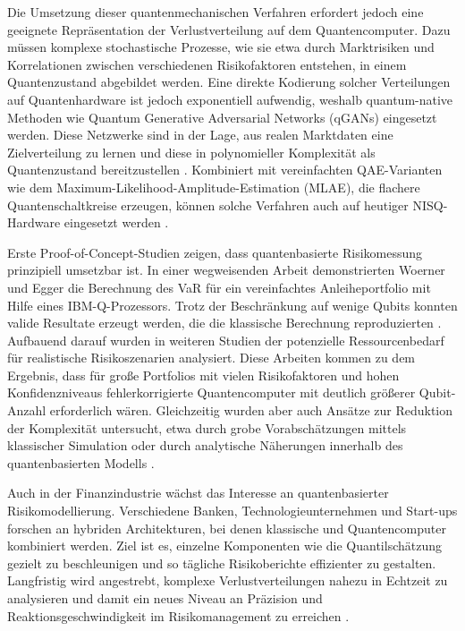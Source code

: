 Die Umsetzung dieser quantenmechanischen Verfahren erfordert jedoch eine geeignete Repräsentation der Verlustverteilung auf dem Quantencomputer. Dazu müssen komplexe stochastische Prozesse, wie sie etwa durch Marktrisiken und Korrelationen zwischen verschiedenen Risikofaktoren entstehen, in einem Quantenzustand abgebildet werden. Eine direkte Kodierung solcher Verteilungen auf Quantenhardware ist jedoch exponentiell aufwendig, weshalb quantum-native Methoden wie Quantum Generative Adversarial Networks (qGANs) eingesetzt werden. Diese Netzwerke sind in der Lage, aus realen Marktdaten eine Zielverteilung zu lernen und diese in polynomieller Komplexität als Quantenzustand bereitzustellen \cite{zoufal_quantum_2019}. Kombiniert mit vereinfachten QAE-Varianten wie dem Maximum-Likelihood-Amplitude-Estimation (MLAE), die flachere Quantenschaltkreise erzeugen, können solche Verfahren auch auf heutiger NISQ-Hardware eingesetzt werden \cite{stamatopoulos_option_2020}.

Erste Proof-of-Concept-Studien zeigen, dass quantenbasierte Risikomessung prinzipiell umsetzbar ist. In einer wegweisenden Arbeit demonstrierten Woerner und Egger die Berechnung des VaR für ein vereinfachtes Anleiheportfolio mit Hilfe eines IBM-Q-Prozessors. Trotz der Beschränkung auf wenige Qubits konnten valide Resultate erzeugt werden, die die klassische Berechnung reproduzierten \cite{egger_quantum_2020}. Aufbauend darauf wurden in weiteren Studien der potenzielle Ressourcenbedarf für realistische Risikoszenarien analysiert. Diese Arbeiten kommen zu dem Ergebnis, dass für große Portfolios mit vielen Risikofaktoren und hohen Konfidenzniveaus fehlerkorrigierte Quantencomputer mit deutlich größerer Qubit-Anzahl erforderlich wären. Gleichzeitig wurden aber auch Ansätze zur Reduktion der Komplexität untersucht, etwa durch grobe Vorabschätzungen mittels klassischer Simulation oder durch analytische Näherungen innerhalb des quantenbasierten Modells \cite{martin2022}.

Auch in der Finanzindustrie wächst das Interesse an quantenbasierter Risikomodellierung. Verschiedene Banken, Technologieunternehmen und Start-ups forschen an hybriden Architekturen, bei denen klassische und Quantencomputer kombiniert werden. Ziel ist es, einzelne Komponenten wie die Quantilschätzung gezielt zu beschleunigen und so tägliche Risikoberichte effizienter zu gestalten. Langfristig wird angestrebt, komplexe Verlustverteilungen nahezu in Echtzeit zu analysieren und damit ein neues Niveau an Präzision und Reaktionsgeschwindigkeit im Risikomanagement zu erreichen \cite{orus_quantum_2019, bouland_prospects_2020}.

